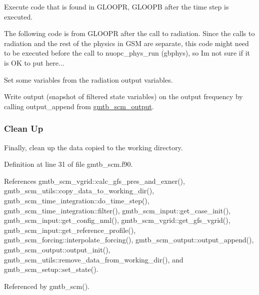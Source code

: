 \begin{DoxyItemize}
\item Execute code that is found in G\+L\+O\+O\+PR, G\+L\+O\+O\+PB after the time step is executed.
\begin{DoxyItemize}
\item The following code is from G\+L\+O\+O\+PR after the call to radiation. Since the calls to radiation and the rest of the physics in G\+SM are separate, this code might need to be executed before the call to nuopc\+\_\+phys\+\_\+run (gbphys), so I\textquotesingle{}m not sure if it is OK to put here...
\item Set some variables from the radiation output variables.
\end{DoxyItemize}
\item Write output (snapshot of filtered state variables) on the output frequency by calling output\+\_\+append from \hyperlink{group__output}{gmtb\+\_\+scm\+\_\+output}.
\end{DoxyItemize}\hypertarget{group___s_c_m_clean_up}{}\subsubsection{Clean Up}\label{group___s_c_m_clean_up}

\begin{DoxyItemize}
\item Finally, clean up the data copied to the working directory.
\end{DoxyItemize}

Definition at line 31 of file gmtb\+\_\+scm.\+f90.



References gmtb\+\_\+scm\+\_\+vgrid\+::calc\+\_\+gfs\+\_\+pres\+\_\+and\+\_\+exner(), gmtb\+\_\+scm\+\_\+utils\+::copy\+\_\+data\+\_\+to\+\_\+working\+\_\+dir(), gmtb\+\_\+scm\+\_\+time\+\_\+integration\+::do\+\_\+time\+\_\+step(), gmtb\+\_\+scm\+\_\+time\+\_\+integration\+::filter(), gmtb\+\_\+scm\+\_\+input\+::get\+\_\+case\+\_\+init(), gmtb\+\_\+scm\+\_\+input\+::get\+\_\+config\+\_\+nml(), gmtb\+\_\+scm\+\_\+vgrid\+::get\+\_\+gfs\+\_\+vgrid(), gmtb\+\_\+scm\+\_\+input\+::get\+\_\+reference\+\_\+profile(), gmtb\+\_\+scm\+\_\+forcing\+::interpolate\+\_\+forcing(), gmtb\+\_\+scm\+\_\+output\+::output\+\_\+append(), gmtb\+\_\+scm\+\_\+output\+::output\+\_\+init(), gmtb\+\_\+scm\+\_\+utils\+::remove\+\_\+data\+\_\+from\+\_\+working\+\_\+dir(), and gmtb\+\_\+scm\+\_\+setup\+::set\+\_\+state().



Referenced by gmtb\+\_\+scm().

